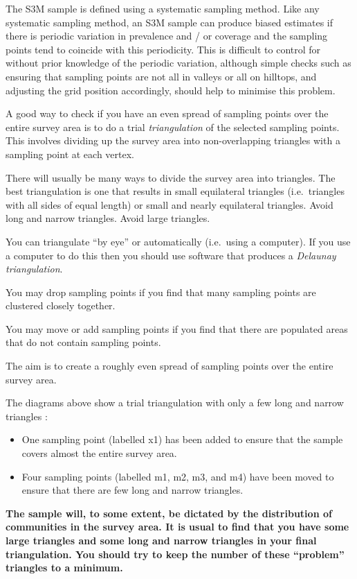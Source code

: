 \documentclass[12pt,a4paper]{book}
\theoremstyle{definition}
\theoremstyle{definition}
\theoremstyle{definition}
\theoremstyle{remark}
\let\BeginKnitrBlock\begin \let\EndKnitrBlock\end
\begin{document}
\BeginKnitrBlock{rmdcaution}
The S3M sample is defined using a systematic sampling method. Like any
systematic sampling method, an S3M sample can produce biased estimates
if there is periodic variation in prevalence and / or coverage and the
sampling points tend to coincide with this periodicity. This is
difficult to control for without prior knowledge of the periodic
variation, although simple checks such as ensuring that sampling points
are not all in valleys or all on hilltops, and adjusting the grid
position accordingly, should help to minimise this problem.
\EndKnitrBlock{rmdcaution}

A good way to check if you have an even spread of sampling points over
the entire survey area is to do a trial \emph{triangulation} of the
selected sampling points. This involves dividing up the survey area into
non-overlapping triangles with a sampling point at each vertex.

There will usually be many ways to divide the survey area into
triangles. The best triangulation is one that results in small
equilateral triangles (i.e.~triangles with all sides of equal length) or
small and nearly equilateral triangles. Avoid long and narrow triangles.
Avoid large triangles.

You can triangulate ``by eye'' or automatically (i.e.~using a computer).
If you use a computer to do this then you should use software that
produces a \emph{Delaunay triangulation}.

You may drop sampling points if you find that many sampling points are
clustered closely together.

You may move or add sampling points if you find that there are populated
areas that do not contain sampling points.

The aim is to create a roughly even spread of sampling points over the
entire survey area.

The diagrams above show a trial triangulation with only a few long and
narrow triangles :

\begin{itemize}
\item
  One sampling point (labelled x1) has been added to ensure that the
  sample covers almost the entire survey area.
\item
  Four sampling points (labelled m1, m2, m3, and m4) have been moved to
  ensure that there are few long and narrow triangles.
\end{itemize}

\textbf{The sample will, to some extent, be dictated by the distribution
of communities in the survey area. It is usual to find that you have
some large triangles and some long and narrow triangles in your final
triangulation. You should try to keep the number of these ``problem''
triangles to a minimum.}
\end{document}
